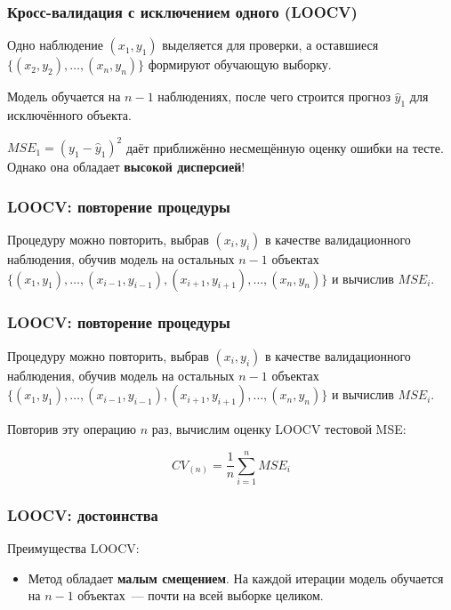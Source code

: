 \documentclass{beamer}
\begin{document}
\begin{frame}
  \frametitle{Кросс-валидация с исключением одного (LOOCV)}

  Одно наблюдение $(x_1, y_1)$ выделяется для проверки, а оставшиеся $\{(x_2, y_2), \ldots, (x_n, y_n)\}$ формируют обучающую выборку.

  \vspace{0.3cm}

  Модель обучается на $n - 1$ наблюдениях, после чего строится прогноз $\hat{y}_1$ для исключённого объекта.

  \vspace{0.3cm}

  $MSE_1 = (y_1 - \hat{y}_1)^2$ даёт приближённо несмещённую оценку ошибки на тесте. Однако она обладает \textbf{высокой дисперсией}!

\end{frame}

\begin{frame}
  \frametitle{LOOCV: повторение процедуры}

  Процедуру можно повторить, выбрав $(x_i, y_i)$ в качестве валидационного наблюдения, обучив модель на остальных $n - 1$ объектах $\{(x_1, y_1), \ldots, (x_{i-1}, y_{i-1}), (x_{i+1}, y_{i+1}), \ldots, (x_n, y_n)\}$ и вычислив $MSE_i$.

\end{frame}

\begin{frame}
  \frametitle{LOOCV: повторение процедуры}

  Процедуру можно повторить, выбрав $(x_i, y_i)$ в качестве валидационного наблюдения, обучив модель на остальных $n - 1$ объектах $\{(x_1, y_1), \ldots, (x_{i-1}, y_{i-1}), (x_{i+1}, y_{i+1}), \ldots, (x_n, y_n)\}$ и вычислив $MSE_i$.

  \vspace{0.3cm}

  Повторив эту операцию $n$ раз, вычислим оценку LOOCV тестовой MSE:

  $$CV_{(n)} = \frac{1}{n} \sum_{i=1}^{n} MSE_i$$

\end{frame}

\begin{frame}
  \frametitle{LOOCV: достоинства}

  Преимущества LOOCV:

  \begin{itemize}
    \item Метод обладает \textbf{малым смещением}. На каждой итерации модель обучается на $n - 1$ объектах~--- почти на всей выборке целиком.
  \end{itemize}

\end{frame}
\end{document}
